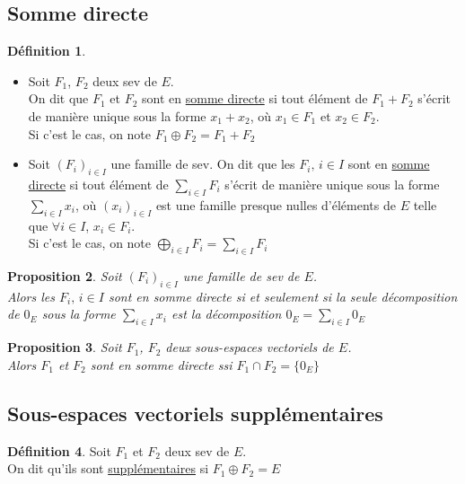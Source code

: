 \documentclass[10pt,a4paper]{article}
\theoremstyle{plain}
\newtheorem{proposition}{Proposition}[section]
\theoremstyle{definition}
\newtheorem{definition}[proposition]{Définition}
\begin{document}
\subsection{Somme directe}
\begin{definition}
\hfill
\begin{itemize}
\item Soit $F_1$, $F_2$ deux sev de $E$. \\
On dit que $F_1$ et $F_2$ sont en \uline{somme directe} si tout élément de $F_1 + F_2$ s'écrit de manière unique sous la forme $x_1 + x_2$, où $x_1 \in F_1$ et $x_2 \in F_2$. \\
Si c'est le cas, on note $F_1 \oplus F_2 = F_1 + F_2$
\item Soit $(F_i)_{i \in I}$ une famille de sev. On dit que les $F_i,\, i \in I$ sont en \uline{somme directe} si tout élément de $\sum\limits_{i \in I} F_i$ s'écrit de manière unique sous la forme $\sum\limits_{i \in I} x_i$, où $(x_i)_{i \in I}$ est une famille presque nulles d'éléments de $E$ telle que $\forall i \in I$, $x_i \in F_i$. \\
Si c'est le cas, on note $\bigoplus\limits_{i \in I} F_i = \sum\limits_{i \in I} F_i$
\end{itemize}
\end{definition}
\begin{proposition}
Soit $(F_i)_{i \in I}$ une famille de sev de $E$. \\
Alors les $F_i,\, i \in I$ sont en somme directe si et seulement si la seule décomposition de $0_E$ sous la forme $\sum\limits_{i \in I} x_i$ est la décomposition $0_E = \sum\limits_{i \in I} 0_E$
\end{proposition}
\begin{proposition}
Soit $F_1$, $F_2$ deux sous-espaces vectoriels de $E$. \\
Alors $F_1$ et $F_2$ sont en somme directe ssi $F_1 \cap F_2 = \{ 0_E \}$
\end{proposition}

\subsection{Sous-espaces vectoriels supplémentaires}
\begin{definition}
Soit $F_1$ et $F_2$ deux sev de $E$. \\
On dit qu'ils sont \uline{supplémentaires} si $F_1 \oplus F_2 = E$
\end{definition}
\end{document}
